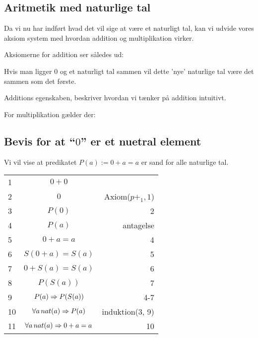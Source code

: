 \subsection*{Aritmetik med naturlige tal}
Da vi nu har indført hvad det vil sige at være et naturligt tal,
kan vi udvide vores aksiom system med hvordan addition og multiplikation virker.

Aksiomerne for addition ser således ud:

\begin{prooftree}
\end{prooftree}
Hvis man ligger 0 og et naturligt tal sammen vil dette 'nye' naturlige tal være det sammen som det første.

\begin{prooftree}
\end{prooftree}
Additions egenskaben, beskriver hvordan vi tænker på addition intuitivt.

For multiplikation gælder der:
\begin{prooftree}
\end{prooftree}

\begin{prooftree}
\end{prooftree}


\subsection*{Bevis for at ``$0$'' er et nuetral element}
Vi vil vise at predikatet $P(a) := 0+a = a$ er sand for alle naturlige tal.

\begin{tabular}{l c r}
    1 & $0+0$ & \\
    2 & $0$ & Axiom($p+_1, 1$) \\
    3 & $P(0)$ & 2 \\
    \hline
    4 & $P(a)$ & antagelse \\
    5 & $0+a = a$ & 4 \\
    6 & $S(0+a) = S(a)$ & 5 \\
    7 & $0+S(a) = S(a)$ & 6 \\
    8 & $P(S(a))$ & 7 \\
    \hline
    9 & $P(a) \imp P(S(a))$ & 4-7 \\
    10 & $\forall a\, nat(a) \imp P(a)$ & induktion(3, 9) \\
    11 & $\forall a\, nat(a) \imp 0+a = a$ & 10
\end{tabular}

